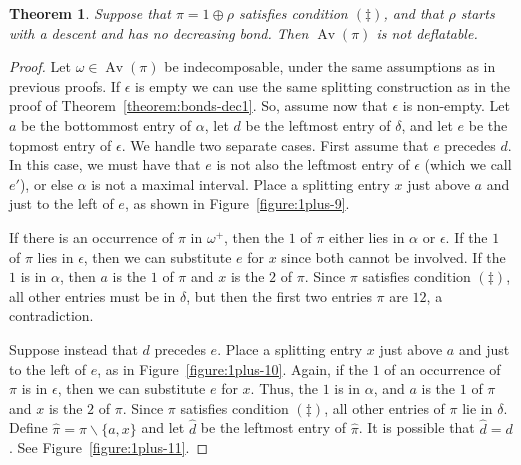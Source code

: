\documentclass[10pt]{article}
\theoremstyle{plain}
\newtheorem{theorem}{Theorem}[section]
\newcommand{\Av}{\operatorname{Av}}
\begin{document}
\begin{theorem}
	\label{theorem:bonds-dec3}
	Suppose that $\pi = 1 \oplus \rho$ satisfies condition $(\ddagger)$, and that $\rho$ starts with a descent and has no decreasing bond. Then $\Av(\pi)$ is not deflatable.
\end{theorem}
\begin{proof}
	Let $\omega \in \Av(\pi)$ be indecomposable, under the same assumptions as in previous proofs. If $\epsilon$ is empty we can use the same splitting construction as in the proof of Theorem~\ref{theorem:bonds-dec1}. So, assume now that $\epsilon$ is non-empty. Let $a$ be the bottommost entry of $\alpha$, let $d$ be the leftmost entry of $\delta$, and let $e$ be the topmost entry of $\epsilon$. We handle two separate cases. First assume that $e$ precedes $d$. In this case, we must have that $e$ is not also the leftmost entry of $\epsilon$ (which we call $e'$), or else $\alpha$ is not a maximal interval. Place a splitting entry $x$ just above $a$ and just to the left of $e$, as shown in Figure~\ref{figure:1plus-9}.

If there is an occurrence of $\pi$ in $\omega^+$, then the $1$ of $\pi$ either lies in $\alpha$ or $\epsilon$. If the $1$ of $\pi$ lies in $\epsilon$, then we can substitute $e$ for $x$ since both cannot be involved. If the $1$ is in $\alpha$, then $a$ is the $1$ of $\pi$ and $x$ is the $2$ of $\pi$. Since $\pi$ satisfies condition $(\ddagger)$, all other entries must be in $\delta$, but then the first two entries $\pi$ are $12$, a contradiction.
  
Suppose instead that $d$ precedes $e$. Place a splitting entry $x$ just above $a$ and just to the left of $e$, as in Figure~\ref{figure:1plus-10}. Again, if the $1$ of an occurrence of $\pi$ is in $\epsilon$, then we can substitute $e$ for $x$. Thus, the $1$ is in $\alpha$, and $a$ is the $1$ of $\pi$ and $x$ is the $2$ of $\pi$. Since $\pi$ satisfies condition $(\ddagger)$, all other entries of $\pi$ lie in $\delta$. Define $\hat{\pi} = \pi \smallsetminus \{a,x\}$ and let $\hat{d}$ be the leftmost entry of $\hat{\pi}$. It is possible that $\hat{d} = d$. See Figure~\ref{figure:1plus-11}.
  

\end{proof}
\end{document}
